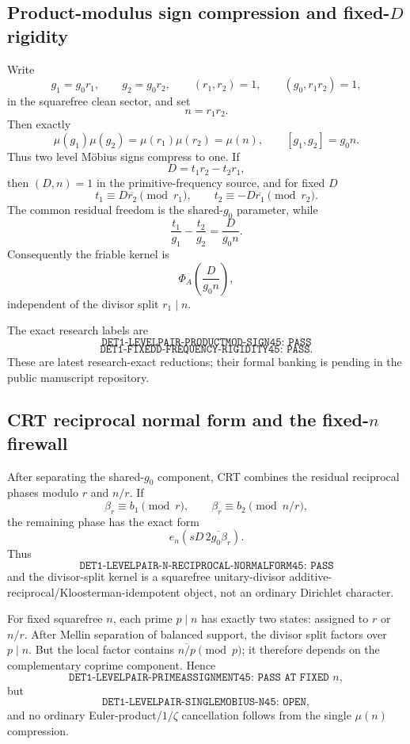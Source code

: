 \documentclass[11pt]{article}
\theoremstyle{definition}
\newcommand{\1}{\mathbf 1}
\begin{document}
\subsection{Product-modulus sign compression and fixed-$D$ rigidity}

Write
\[
g_1=g_0r_1,\qquad g_2=g_0r_2,
\qquad
(r_1,r_2)=1,\qquad(g_0,r_1r_2)=1,
\]
in the squarefree clean sector, and set
\[
n=r_1r_2.
\]
Then exactly
\[
\boxed{
\mu(g_1)\mu(g_2)
=
\mu(r_1)\mu(r_2)
=
\mu(n),
}
\qquad
[g_1,g_2]=g_0n.
\]
Thus two level M\"obius signs compress to one.  If
\[
D=t_1r_2-t_2r_1,
\]
then $(D,n)=1$ in the primitive-frequency source, and for fixed $D$
\[
t_1\equiv D\overline{r_2}\pmod{r_1},
\qquad
t_2\equiv-D\overline{r_1}\pmod{r_2}.
\]
The common residual freedom is the shared-$g_0$ parameter, while
\[
\boxed{
\frac{t_1}{g_1}-\frac{t_2}{g_2}
=
\frac{D}{g_0n}.
}
\]
Consequently the friable kernel is
\[
\Phi_A\!\left(\frac{D}{g_0n}\right),
\]
independent of the divisor split $r_1\mid n$.

The exact research labels are
\[
\boxed{\texttt{DET1-LEVELPAIR-PRODUCTMOD-SIGN45: PASS}}
\]
\[
\boxed{\texttt{DET1-FIXEDD-FREQUENCY-RIGIDITY45: PASS}}.
\]
These are latest research-exact reductions; their formal banking is pending in the public
manuscript repository.

\subsection{CRT reciprocal normal form and the fixed-$n$ firewall}

After separating the shared-$g_0$ component, CRT combines the residual reciprocal phases
modulo $r$ and $n/r$.  If
\[
\beta_r\equiv b_1\pmod r,
\qquad
\beta_r\equiv b_2\pmod{n/r},
\]
the remaining phase has the exact form
\[
\boxed{
e_n\!\left(
sD\,\overline{2g_0\beta_r}
\right).
}
\]
Thus
\[
\boxed{\texttt{DET1-LEVELPAIR-N-RECIPROCAL-NORMALFORM45: PASS}}
\]
and the divisor-split kernel is a squarefree unitary-divisor
additive-reciprocal/Kloosterman-idempotent object, not an ordinary Dirichlet character.

For fixed squarefree $n$, each prime $p\mid n$ has exactly two states: assigned to $r$ or
$n/r$.  After Mellin separation of balanced support, the divisor split factors over
$p\mid n$.  But the local factor contains $\overline{n/p}\pmod p$; it therefore depends
on the complementary coprime component.  Hence
\[
\boxed{\texttt{DET1-LEVELPAIR-PRIMEASSIGNMENT45: PASS AT FIXED }n},
\]
but
\[
\boxed{\texttt{DET1-LEVELPAIR-SINGLEMOBIUS-N45: OPEN}},
\]
and no ordinary Euler-product/$1/\zeta$ cancellation follows from the single $\mu(n)$
compression.
\end{document}
